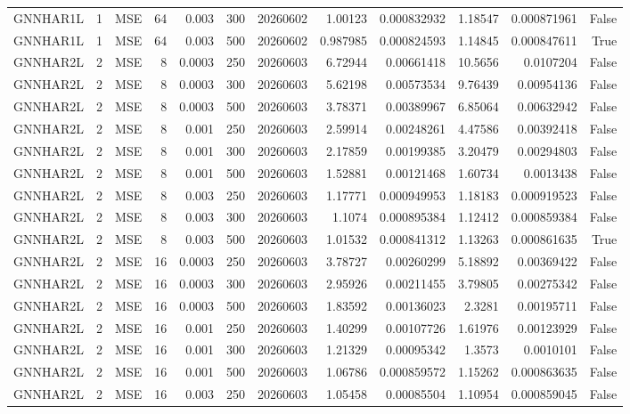 \begin{tabular}{lrlrrrrrrrrr}
GNNHAR1L & 1 & MSE & 64 & 0.003 & 300 & 20260602 & 1.00123 & 0.000832932 & 1.18547 & 0.000871961 & False \\
GNNHAR1L & 1 & MSE & 64 & 0.003 & 500 & 20260602 & 0.987985 & 0.000824593 & 1.14845 & 0.000847611 & True \\
GNNHAR2L & 2 & MSE & 8 & 0.0003 & 250 & 20260603 & 6.72944 & 0.00661418 & 10.5656 & 0.0107204 & False \\
GNNHAR2L & 2 & MSE & 8 & 0.0003 & 300 & 20260603 & 5.62198 & 0.00573534 & 9.76439 & 0.00954136 & False \\
GNNHAR2L & 2 & MSE & 8 & 0.0003 & 500 & 20260603 & 3.78371 & 0.00389967 & 6.85064 & 0.00632942 & False \\
GNNHAR2L & 2 & MSE & 8 & 0.001 & 250 & 20260603 & 2.59914 & 0.00248261 & 4.47586 & 0.00392418 & False \\
GNNHAR2L & 2 & MSE & 8 & 0.001 & 300 & 20260603 & 2.17859 & 0.00199385 & 3.20479 & 0.00294803 & False \\
GNNHAR2L & 2 & MSE & 8 & 0.001 & 500 & 20260603 & 1.52881 & 0.00121468 & 1.60734 & 0.0013438 & False \\
GNNHAR2L & 2 & MSE & 8 & 0.003 & 250 & 20260603 & 1.17771 & 0.000949953 & 1.18183 & 0.000919523 & False \\
GNNHAR2L & 2 & MSE & 8 & 0.003 & 300 & 20260603 & 1.1074 & 0.000895384 & 1.12412 & 0.000859384 & False \\
GNNHAR2L & 2 & MSE & 8 & 0.003 & 500 & 20260603 & 1.01532 & 0.000841312 & 1.13263 & 0.000861635 & True \\
GNNHAR2L & 2 & MSE & 16 & 0.0003 & 250 & 20260603 & 3.78727 & 0.00260299 & 5.18892 & 0.00369422 & False \\
GNNHAR2L & 2 & MSE & 16 & 0.0003 & 300 & 20260603 & 2.95926 & 0.00211455 & 3.79805 & 0.00275342 & False \\
GNNHAR2L & 2 & MSE & 16 & 0.0003 & 500 & 20260603 & 1.83592 & 0.00136023 & 2.3281 & 0.00195711 & False \\
GNNHAR2L & 2 & MSE & 16 & 0.001 & 250 & 20260603 & 1.40299 & 0.00107726 & 1.61976 & 0.00123929 & False \\
GNNHAR2L & 2 & MSE & 16 & 0.001 & 300 & 20260603 & 1.21329 & 0.00095342 & 1.3573 & 0.0010101 & False \\
GNNHAR2L & 2 & MSE & 16 & 0.001 & 500 & 20260603 & 1.06786 & 0.000859572 & 1.15262 & 0.000863635 & False \\
GNNHAR2L & 2 & MSE & 16 & 0.003 & 250 & 20260603 & 1.05458 & 0.00085504 & 1.10954 & 0.000859045 & False \\

\end{tabular}
